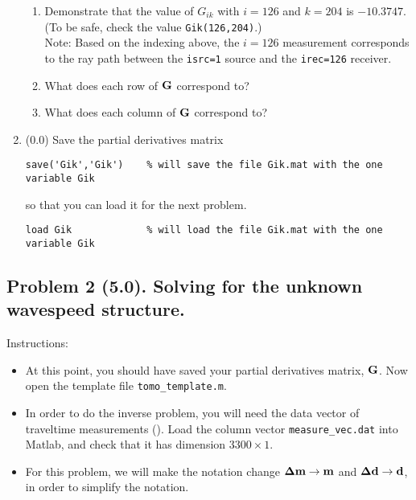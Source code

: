 \documentclass[11pt,titlepage,fleqn]{article}
\begin{document}
\begin{enumerate}
\begin{enumerate}
\item Demonstrate that the value of $G_{ik}$ with $i=126$ and $k=204$ is $-10.3747$. \\
(To be safe, check the value \verb+Gik(126,204)+.) \\
Note: Based on the indexing above, the $i=126$ measurement corresponds to the ray path between the \verb+isrc=1+ source and the \verb+irec=126+ receiver.

\item What does each row of $\mbox{${\bf G}$}$ correspond to?

\item What does each column of $\mbox{${\bf G}$}$ correspond to?
\end{enumerate}


\item (0.0) Save the partial derivatives matrix
%
\begin{verbatim}
save('Gik','Gik')    % will save the file Gik.mat with the one variable Gik
\end{verbatim}
%
so that you can load it for the next problem.
%
\begin{verbatim}
load Gik             % will load the file Gik.mat with the one variable Gik
\end{verbatim}

\end{enumerate}


\subsection*{Problem 2 (5.0). Solving for the unknown wavespeed structure.}

Instructions:
%
\begin{itemize}
\item At this point, you should have saved your partial derivatives matrix, $\mbox{${\bf G}$}$. Now open the template file \verb+tomo_template.m+.

\item In order to do the inverse problem, you will need the data vector of traveltime measurements (). Load the column vector \verb+measure_vec.dat+ into Matlab, and check that it has dimension $3300 \times 1$.

\item For this problem, we will make the notation change $\mbox{\boldmath $\bf \Delta$}\mbox{${\bf m}$} \rightarrow \mbox{${\bf m}$}$ and $\mbox{\boldmath $\bf \Delta$}\mbox{${\bf d}$} \rightarrow \mbox{${\bf d}$}$, in order to simplify the notation.
\end{itemize}
\end{document}
